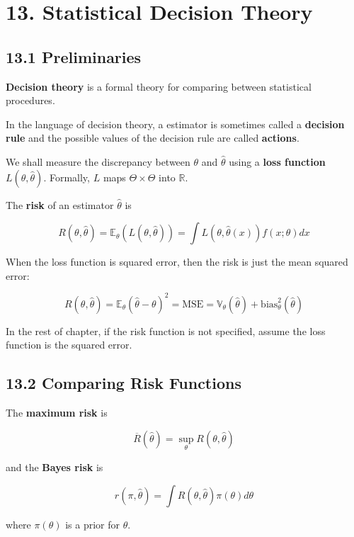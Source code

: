 \section{13. Statistical Decision Theory}\label{statistical-decision-theory}

\subsection{13.1 Preliminaries}\label{preliminaries}

\textbf{Decision theory} is a formal theory for comparing between
statistical procedures.

In the language of decision theory, a estimator is sometimes called a
\textbf{decision rule} and the possible values of the decision rule are
called \textbf{actions}.

We shall measure the discrepancy between \(\theta\) and \(\hat{\theta}\)
using a \textbf{loss function} \(L(\theta, \hat{\theta})\). Formally,
\(L\) maps \(\Theta \times \Theta\) into \(\mathbb{R}\).

The \textbf{risk} of an estimator \(\hat{\theta}\) is

\[ R(\theta, \hat{\theta}) = \mathbb{E}_\theta \left( L(\theta, \hat{\theta}) \right)
= \int L(\theta, \hat{\theta}(x)) f(x; \theta) dx\]

When the loss function is squared error, then the risk is just the mean
squared error:

\[R(\theta, \hat{\theta}) = \mathbb{E}_\theta(\hat{\theta} - \theta)^2 = \text{MSE} = \mathbb{V}_\theta(\hat{\theta}) + \text{bias}_\theta^2(\hat{\theta})\]

In the rest of chapter, if the risk function is not specified, assume
the loss function is the squared error.

\subsection{13.2 Comparing Risk
Functions}\label{comparing-risk-functions}

The \textbf{maximum risk} is

\[ \overline{R}(\hat{\theta}) = \sup_\theta R(\theta, \hat{\theta})\]

and the \textbf{Bayes risk} is

\[ r(\pi, \hat{\theta}) = \int R(\theta, \hat{\theta}) \pi(\theta) d\theta\]

where \(\pi(\theta)\) is a prior for \(\theta\).

